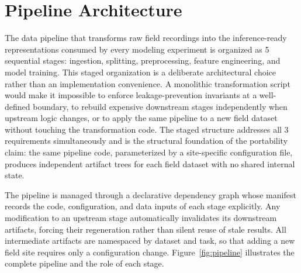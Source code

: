 \section{Pipeline Architecture}
\label{sec:pipeline-architecture}

The data pipeline that transforms raw field recordings into the inference-ready representations consumed by every modeling experiment is organized as 5 sequential stages: ingestion, splitting, preprocessing, feature engineering, and model training. This staged organization is a deliberate architectural choice rather than an implementation convenience. A monolithic transformation script would make it impossible to enforce leakage-prevention invariants at a well-defined boundary, to rebuild expensive downstream stages independently when upstream logic changes, or to apply the same pipeline to a new field dataset without touching the transformation code. The staged structure addresses all 3 requirements simultaneously and is the structural foundation of the portability claim: the same pipeline code, parameterized by a site-specific configuration file, produces independent artifact trees for each field dataset with no shared internal state.

The pipeline is managed through a declarative dependency graph whose manifest records the code, configuration, and data inputs of each stage explicitly. Any modification to an upstream stage automatically invalidates its downstream artifacts, forcing their regeneration rather than silent reuse of stale results. All intermediate artifacts are namespaced by dataset and task, so that adding a new field site requires only a configuration change. Figure~\ref{fig:pipeline} illustrates the complete pipeline and the role of each stage.

